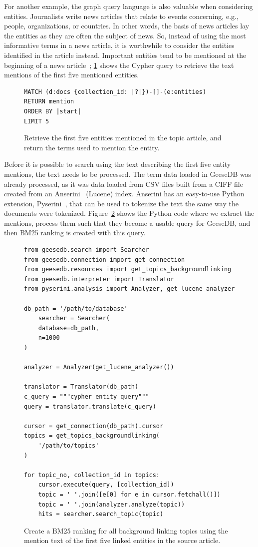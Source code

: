 For another example, the graph query language is also valuable when considering entities. Journalists write news articles that relate to events concerning, e.g., people, organizations, or countries. In other words, the basis of news articles lay the entities as they are often the subject of news. So, instead of using the most informative terms in a news article, it is worthwhile to consider the entities identified in the article instead. Important entities tend to be mentioned at the beginning of a news article~\cite{entities-loc}; \cref{fig:entity-cypher} shows the Cypher query to retrieve the text mentions of the first five mentioned entities.

\begin{figure}
	\begin{verbatim}
MATCH (d:docs {collection_id: |?|})-[]-(e:entities)
RETURN mention
ORDER BY |start|
LIMIT 5
	\end{verbatim}
	\caption{Retrieve the first five entities mentioned in the topic article, and return the terms used to mention the entity.}
	\label{fig:entity-cypher}
\end{figure}
\noindent Before it is possible to search using the text describing the first five entity mentions, the text needs to be processed. The term data loaded in GeeseDB was already processed, as it was data loaded from CSV files built from a CIFF file created from an Anserini~\cite{anserini} (Lucene) index. Anserini has an easy-to-use Python extension, Pyserini~\cite{pyserini}, that can be used to tokenize the text the same way the documents were tokenized. Figure~\ref{fig:entities-code} shows the Python code where we extract the mentions, process them such that they become a usable query for GeeseDB, and then BM25 ranking is created with this query.

\begin{figure}
	\begin{verbatim}
from geesedb.search import Searcher
from geesedb.connection import get_connection
from geesedb.resources import get_topics_backgroundlinking
from geesedb.interpreter import Translator
from pyserini.analysis import Analyzer, get_lucene_analyzer

db_path = '/path/to/database'
    searcher = Searcher(
    database=db_path,
    n=1000
)

analyzer = Analyzer(get_lucene_analyzer())

translator = Translator(db_path)
c_query = """cypher entity query"""
query = translator.translate(c_query)

cursor = get_connection(db_path).cursor
topics = get_topics_backgroundlinking(
    '/path/to/topics'
)

for topic_no, collection_id in topics:
    cursor.execute(query, [collection_id])
    topic = ' '.join([e[0] for e in cursor.fetchall()]) 
    topic = ' '.join(analyzer.analyze(topic))
    hits = searcher.search_topic(topic)
	\end{verbatim}
	\caption{Create a BM25 ranking for all background linking topics using the mention text of the first five linked entities in the source article.}
	\label{fig:entities-code}
\end{figure}

